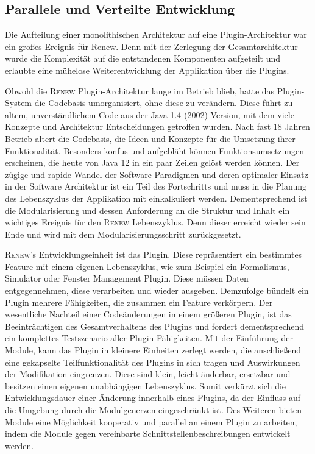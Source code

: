 	\subsection{Parallele und Verteilte Entwicklung}\label{sub:vez}
		Die Aufteilung einer monolithischen Architektur auf eine Plugin-Architektur war ein großes Ereignis für Renew. Denn mit der Zerlegung der Gesamtarchitektur wurde die Komplexität auf die entstandenen Komponenten aufgeteilt und erlaubte eine mühelose Weiterentwicklung der Applikation über die Plugins. \bigbreak

		Obwohl die \textsc{Renew} Plugin-Architektur lange im Betrieb blieb, hatte das Plugin-System die Codebasis umorganisiert, ohne diese zu verändern. Diese führt zu altem, unverständlichem Code aus der Java 1.4 (2002) Version, mit dem viele Konzepte und Architektur Entscheidungen getroffen wurden. Nach fast 18 Jahren Betrieb altert die Codebasis, die Ideen und Konzepte für die Umsetzung ihrer Funktionalität. Besonders konfus und aufgebläht können Funktionsumsetzungen erscheinen, die heute von Java 12 in ein paar Zeilen gelöst werden können. Der zügige und rapide Wandel der Software Paradigmen und deren optimaler Einsatz in der Software Architektur ist ein Teil des Fortschritts und muss in die Planung des Lebenszyklus der Applikation mit einkalkuliert werden. \newline
		Dementsprechend ist die Modularisierung und dessen Anforderung an die Struktur und Inhalt ein wichtiges Ereignis für den \textsc{Renew} Lebenszyklus. Denn dieser erreicht wieder sein Ende und wird mit dem Modularisierungsschritt zurückgesetzt. \bigbreak

		\textsc{Renew}'s Entwicklungseinheit ist das Plugin. Diese repräsentiert ein bestimmtes Feature mit einem eigenen Lebenszyklus, wie zum Beispiel ein Formalismus, Simulator oder Fenster Management Plugin. Diese müssen Daten entgegennehmen, diese verarbeiten und wieder ausgeben. Demzufolge bündelt ein Plugin mehrere Fähigkeiten, die zusammen ein Feature verkörpern. Der wesentliche Nachteil einer Codeänderungen in einem größeren Plugin, ist das Beeinträchtigen des Gesamtverhaltens des Plugins und fordert dementsprechend ein komplettes Testszenario aller Plugin Fähigkeiten.\newline
		Mit der Einführung der Module, kann das Plugin in kleinere Einheiten zerlegt werden, die anschließend eine gekapselte Teilfunktionalität des Plugins in sich tragen und Auswirkungen der Modifikation eingrenzen. Diese sind klein, leicht änderbar, ersetzbar und besitzen einen eigenen unabhängigen Lebenszyklus. Somit verkürzt sich die Entwicklungsdauer einer Änderung innerhalb eines Plugins, da der Einfluss auf die Umgebung durch die Modulgenerzen eingeschränkt ist. Des Weiteren  bieten Module eine Möglichkeit kooperativ und parallel an einem Plugin zu arbeiten, indem die Module gegen vereinbarte Schnittstellenbeschreibungen entwickelt werden. \bigbreak

